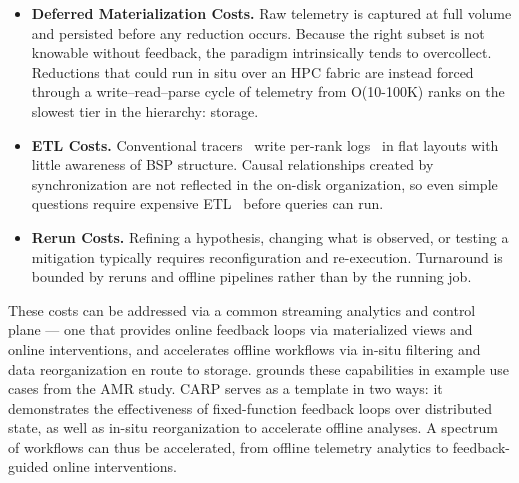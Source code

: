 \begin{itemize}[leftmargin=*]
  \item \textbf{Deferred Materialization Costs.
        }
        Raw telemetry is captured at full volume and
        persisted
        before any reduction occurs.
        Because the right subset is not knowable without feedback,
        the paradigm intrinsically tends to overcollect.
        Reductions that could run in situ over an HPC fabric are instead forced through a
        write--read--parse cycle of telemetry from O(10-100K) ranks on the slowest tier in the hierarchy:
        storage.

  \item \textbf{ETL Costs.
        }
        Conventional
        tracers~\cite{Shend2006:TAU,Knupf2012:Score-P,2025:PytorchKineto,Devar2024:DFTracer,Boehm2016:Caliper}
        write per-rank logs~\cite{:ChromeJsonTEF,Eschw2012:OTF2} in flat layouts
        with little awareness of BSP structure.
        Causal relationships created by synchronization are not reflected in the on-disk organization,
        so even simple questions require expensive ETL~\cite{Yildi2023:IOMax,Jain2025:AMR} before queries
        can run.

  \item \textbf{Rerun Costs.
        }
        Refining a hypothesis, changing what is observed, or
        testing a mitigation typically requires reconfiguration and re-execution.
        Turnaround is bounded by
        reruns and offline pipelines rather than by the running job.
\end{itemize}


\tabIntroCaps{}

These costs can be addressed via a common streaming analytics and control plane --- one that provides
online feedback loops via materialized views and online interventions, and accelerates offline workflows
via in-situ filtering and data reorganization en route to storage.
 grounds these capabilities in example use cases from the AMR study.
CARP serves as a template in two ways: it demonstrates
the effectiveness of fixed-function feedback loops over distributed state, as well as in-situ
reorganization to accelerate offline analyses.
A spectrum of workflows can thus be accelerated, from offline telemetry analytics to
feedback-guided online interventions.



